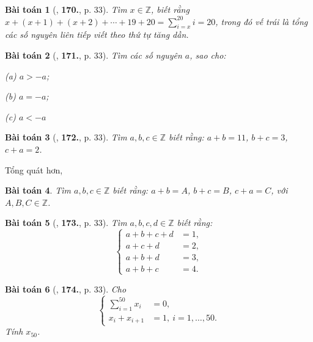 \documentclass{article}
\numberwithin{equation}{section}
\newtheorem{baitoan}{Bài toán}[section]
\begin{document}
\begin{baitoan}[\cite{Binh_Toan_6_tap_1}, \textbf{170.}, p. 33]
	Tìm $x\in\mathbb{Z}$, biết rằng $x + (x + 1) + (x + 2) + \cdots + 19 + 20 = \sum_{i=x}^{20} i = 20$, trong đó vế trái là tổng các số nguyên liên tiếp viết theo thứ tự tăng dần.
\end{baitoan}

\begin{baitoan}[\cite{Binh_Toan_6_tap_1}, \textbf{171.}, p. 33]
	Tìm các số nguyên $a$, sao cho:
	\begin{enumerate*}
		\item[(a)] $a > -a$;
		\item[(b)] $a = -a$;
		\item[(c)] $a < -a$
	\end{enumerate*}
\end{baitoan}

\begin{baitoan}[\cite{Binh_Toan_6_tap_1}, \textbf{172.}, p. 33]
	Tìm $a,b,c\in\mathbb{Z}$ biết rằng: $a + b = 11$, $b + c = 3$, $c + a = 2$.
\end{baitoan}
Tổng quát hơn,
\begin{baitoan}
	Tìm $a,b,c\in\mathbb{Z}$ biết rằng: $a + b = A$, $b + c = B$, $c + a = C$, với $A,B,C\in\mathbb{Z}$.
\end{baitoan}

\begin{baitoan}[\cite{Binh_Toan_6_tap_1}, \textbf{173.}, p. 33]
	Tìm $a,b,c,d\in\mathbb{Z}$ biết rằng:
	\begin{equation*}
		\left\{\begin{split}
			a + b + c + d &= 1,\\
			a + c + d &= 2,\\
			a + b + d &= 3,\\
			a + b + c &= 4.
		\end{split}\right.		
	\end{equation*}
\end{baitoan}

\begin{baitoan}[\cite{Binh_Toan_6_tap_1}, \textbf{174.}, p. 33]
	Cho
	\begin{equation*}
		\left\{\begin{split}
			\sum_{i=1}^{50} x_i &= 0,\\
			x_i + x_{i+1} &= 1,\ i = 1,\ldots,50.
		\end{split}\right.		
	\end{equation*}
	Tính $x_{50}$.
\end{baitoan}
\end{document}
